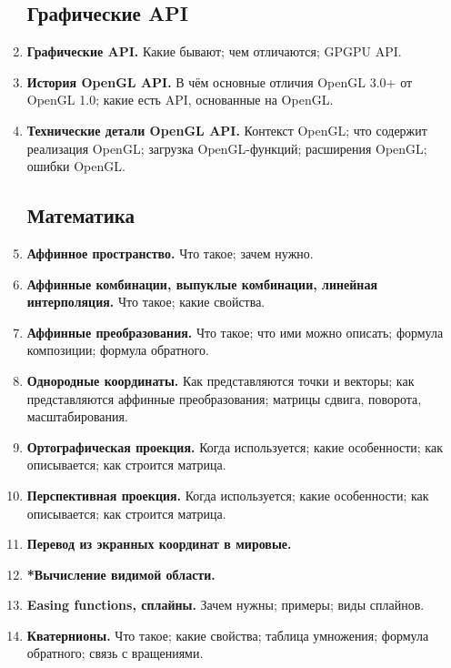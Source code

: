 \documentclass{article}
\begin{document}
\begin{enumerate}
\subsection{Графические API}
\item \textbf{Графические API.} Какие бывают; чем отличаются; GPGPU API.
\item \textbf{История OpenGL API.} В чём основные отличия OpenGL 3.0+ от OpenGL 1.0; какие есть API, основанные на OpenGL.
\item \textbf{Технические детали OpenGL API.} Контекст OpenGL; что содержит реализация OpenGL; загрузка OpenGL-функций; расширения OpenGL; ошибки OpenGL.

\subsection{Математика}
\item \textbf{Аффинное пространство.} Что такое; зачем нужно.
\item \textbf{Аффинные комбинации, выпуклые комбинации, линейная интерполяция.} Что такое; какие свойства.
\item \textbf{Аффинные преобразования.} Что такое; что ими можно описать; формула композиции; формула обратного.
\item \textbf{Однородные координаты.} Как представляются точки и векторы; как представляются аффинные преобразования; матрицы сдвига, поворота, масштабирования.
\item \textbf{Ортографическая проекция.} Когда используется; какие особенности; как описывается; как строится матрица.
\item \textbf{Перспективная проекция.} Когда используется; какие особенности; как описывается; как строится матрица.
\item \textbf{Перевод из экранных координат в мировые.}
\item \textbf{*Вычисление видимой области.}
\item \textbf{Easing functions, сплайны.} Зачем нужны; примеры; виды сплайнов.
\item \textbf{Кватернионы.} Что такое; какие свойства; таблица умножения; формула обратного; связь с вращениями.


\end{enumerate}
\end{document}
